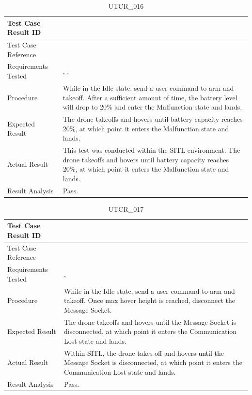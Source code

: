 \documentclass[12pt, titlepage]{article}
\begin{document}
\begin{table}[!h]
\begin{center}
\caption {UTCR\_016}
\label{tab:UTCR_016}
\begin{tabular}{ | m{3.2cm} | m{12.2cm} | } 
\hline
Test Case Result ID & \nameref{tab:UTCR_016} \\ 
\hline
Test Case Reference & \nameref{tab:UTC_016}  \\ 
\hline
Requirements Tested & \nameref{STA_009}, \nameref{SR_007}, \nameref{SR_011} \\ 
\hline
Procedure & While in the Idle state, send a user command to arm and takeoff. After a sufficient amount of time, the battery level will drop to 20\% and enter the Malfunction state and lands. \\ 
\hline
Expected Result & The drone takeoffs and hovers until battery capacity reaches 20\%, at which point it enters the Malfunction state and lands. \\
\hline
Actual Result & This test was conducted within the SITL environment. The drone takeoffs and hovers until battery capacity reaches 20\%, at which point it enters the Malfunction state and lands. \\
\hline
Result Analysis & Pass.\\ 
\hline
\end{tabular}
\end{center}
\end{table}

\begin{table}[!h]
\begin{center}
\caption {UTCR\_017}
\label{tab:UTCR_017}
\begin{tabular}{ | m{3.2cm} | m{12.2cm} | } 
\hline
Test Case Result ID & \nameref{tab:UTCR_017} \\ 
\hline
Test Case Reference & \nameref{tab:UTC_017}  \\ 
\hline
Requirements Tested & \nameref{STA_010}, \nameref{TRANS_010} \\ 
\hline
Procedure & While in the Idle state, send a user command to arm and takeoff. Once max hover height is reached, disconnect the Message Socket. \\ 
\hline
Expected Result & The drone takeoffs and hovers until the Message Socket is disconnected, at which point it enters the Communication Lost state and lands. \\
\hline
Actual Result & Within SITL, the drone takes off and hovers until the Message Socket is disconnected, at which point it enters the Communication Lost state and lands.  \\
\hline
Result Analysis & Pass. \\ 
\hline
\end{tabular}
\end{center}
\end{table}
\end{document}
